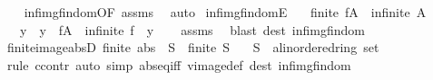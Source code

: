 \begin{isabellebody}
%
\isadelimproof
\ \ %
\endisadelimproof
%
\isatagproof
{}\isamarkupfalse%
\ inf{\isacharunderscore}{\kern0pt}img{\isacharunderscore}{\kern0pt}fin{\isacharunderscore}{\kern0pt}dom{\isacharprime}{\kern0pt}{\isacharbrackleft}{\kern0pt}OF\ assms{\isacharbrackright}{\kern0pt}\ \isamarkupfalse%
\ auto%
\endisatagproof
{\isafoldproof}%
%
\isadelimproof
\isanewline
%
\endisadelimproof
\isanewline
{}\isamarkupfalse%
\ inf{\isacharunderscore}{\kern0pt}img{\isacharunderscore}{\kern0pt}fin{\isacharunderscore}{\kern0pt}domE{\isacharcolon}{\kern0pt}\isanewline
\ \ \ {\isachardoublequoteopen}finite\ {\isacharparenleft}{\kern0pt}f{\isacharbackquote}{\kern0pt}A{\isacharparenright}{\kern0pt}{\isachardoublequoteclose}\ \ {\isachardoublequoteopen}infinite\ A{\isachardoublequoteclose}\isanewline
\ \ \ y\ \ {\isachardoublequoteopen}y\ {\isasymin}\ f{\isacharbackquote}{\kern0pt}A{\isachardoublequoteclose}\ \ {\isachardoublequoteopen}infinite\ {\isacharparenleft}{\kern0pt}f\ {\isacharminus}{\kern0pt}{\isacharbackquote}{\kern0pt}\ {\isacharbraceleft}{\kern0pt}y{\isacharbraceright}{\kern0pt}{\isacharparenright}{\kern0pt}{\isachardoublequoteclose}\isanewline
%
\isadelimproof
\ \ %
\endisadelimproof
%
\isatagproof
{}\isamarkupfalse%
\ assms\ \isamarkupfalse%
\ {\isacharparenleft}{\kern0pt}blast\ dest{\isacharcolon}{\kern0pt}\ inf{\isacharunderscore}{\kern0pt}img{\isacharunderscore}{\kern0pt}fin{\isacharunderscore}{\kern0pt}dom{\isacharparenright}{\kern0pt}%
\endisatagproof
{\isafoldproof}%
%
\isadelimproof
\isanewline
%
\endisadelimproof
\isanewline
{}\isamarkupfalse%
\ finite{\isacharunderscore}{\kern0pt}image{\isacharunderscore}{\kern0pt}absD{\isacharcolon}{\kern0pt}\ {\isachardoublequoteopen}finite\ {\isacharparenleft}{\kern0pt}abs\ {\isacharbackquote}{\kern0pt}\ S{\isacharparenright}{\kern0pt}\ {\isasymLongrightarrow}\ finite\ S{\isachardoublequoteclose}\isanewline
\ \ \ S\ {\isacharcolon}{\kern0pt}{\isacharcolon}{\kern0pt}\ {\isachardoublequoteopen}{\isacharprime}{\kern0pt}a{\isacharcolon}{\kern0pt}{\isacharcolon}{\kern0pt}linordered{\isacharunderscore}{\kern0pt}ring\ set{\isachardoublequoteclose}\isanewline
%
\isadelimproof
\ \ %
\endisadelimproof
%
\isatagproof
{}\isamarkupfalse%
\ {\isacharparenleft}{\kern0pt}rule\ ccontr{\isacharparenright}{\kern0pt}\ {\isacharparenleft}{\kern0pt}auto\ simp{\isacharcolon}{\kern0pt}\ abs{\isacharunderscore}{\kern0pt}eq{\isacharunderscore}{\kern0pt}iff\ vimage{\isacharunderscore}{\kern0pt}def\ dest{\isacharcolon}{\kern0pt}\ inf{\isacharunderscore}{\kern0pt}img{\isacharunderscore}{\kern0pt}fin{\isacharunderscore}{\kern0pt}dom{\isacharparenright}{\kern0pt}%

\end{isabellebody}

